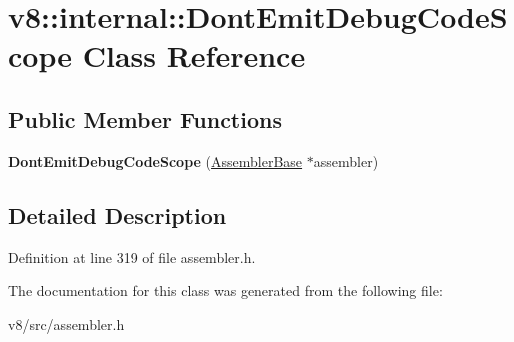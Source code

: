\hypertarget{classv8_1_1internal_1_1DontEmitDebugCodeScope}{}\section{v8\+:\+:internal\+:\+:Dont\+Emit\+Debug\+Code\+Scope Class Reference}
\label{classv8_1_1internal_1_1DontEmitDebugCodeScope}
\subsection*{Public Member Functions}
\begin{DoxyCompactItemize}
\item 
\mbox{\label{classv8_1_1internal_1_1DontEmitDebugCodeScope_a0936541904ae61621710c5dec0dd8473}} 
{\bfseries Dont\+Emit\+Debug\+Code\+Scope} (\mbox{\hyperlink{classv8_1_1internal_1_1AssemblerBase}{Assembler\+Base}} $\ast$assembler)
\end{DoxyCompactItemize}


\subsection{Detailed Description}


Definition at line 319 of file assembler.\+h.



The documentation for this class was generated from the following file\+:\begin{DoxyCompactItemize}
\item 
v8/src/assembler.\+h\end{DoxyCompactItemize}
